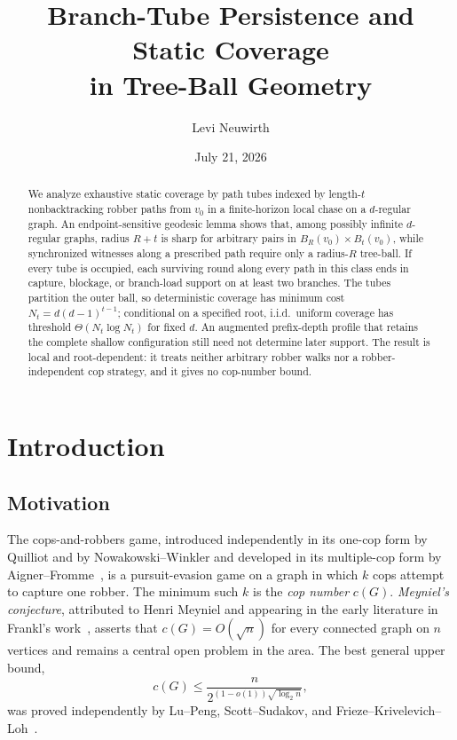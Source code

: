 \documentclass[11pt]{amsart}
\title[Branch-Tube Persistence and Static Coverage]{Branch-Tube Persistence and Static Coverage\\in Tree-Ball Geometry}
\author{Levi Neuwirth}
\date{July 21, 2026}
\theoremstyle{definition}
\begin{document}
\begin{abstract}
We analyze exhaustive static coverage by path tubes indexed by length-$t$ nonbacktracking robber paths from $v_0$ in a finite-horizon local chase on a $d$-regular graph. An endpoint-sensitive geodesic lemma shows that, among possibly infinite $d$-regular graphs, radius $R+t$ is sharp for arbitrary pairs in $B_R(v_0)\times B_t(v_0)$, while synchronized witnesses along a prescribed path require only a radius-$R$ tree-ball. If every tube is occupied, each surviving round along every path in this class ends in capture, blockage, or branch-load support on at least two branches. The tubes partition the outer ball, so deterministic coverage has minimum cost $N_t=d(d-1)^{t-1}$; conditional on a specified root, i.i.d.\ uniform coverage has threshold $\Theta(N_t\log N_t)$ for fixed $d$. An augmented prefix-depth profile that retains the complete shallow configuration still need not determine later support. The result is local and root-dependent: it treats neither arbitrary robber walks nor a robber-independent cop strategy, and it gives no cop-number bound.
\end{abstract}

\maketitle


\section{Introduction}

\subsection{Motivation}

The cops-and-robbers game, introduced independently in its one-cop form by Quilliot and by Nowakowski--Winkler and developed in its multiple-cop form by Aigner--Fromme~\cite{Quilliot,NowakowskiWinkler,AignerFromme}, is a pursuit-evasion game on a graph in which $k$ cops attempt to capture one robber. The minimum such $k$ is the \emph{cop number} $c(G)$. \emph{Meyniel's conjecture}, attributed to Henri Meyniel and appearing in the early literature in Frankl's work~\cite{Frankl}, asserts that $c(G)=O(\sqrt n)$ for every connected graph on $n$ vertices and remains a central open problem in the area. The best general upper bound,
\[
c(G) \leq \frac{n}{2^{(1-o(1))\sqrt{\log_2 n}}},
\]
was proved independently by Lu--Peng, Scott--Sudakov, and Frieze--Krivelevich--Loh~\cite{LuPeng,ScottSudakov,FriezeKrivelevichLoh}.
\end{document}
